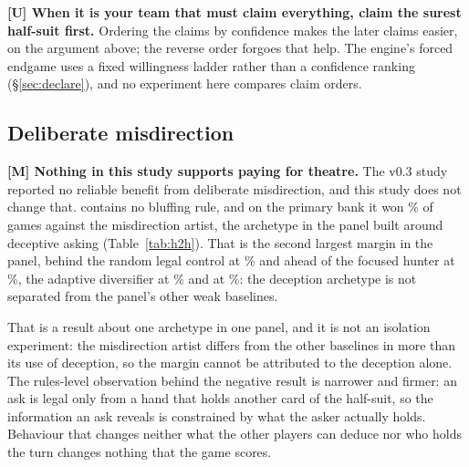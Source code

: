 \textbf{[U] When it is your team that must claim everything, claim the surest
half-suit first.} Ordering the claims by confidence makes the later claims
easier, on the argument above; the reverse order forgoes that help. The
engine's forced endgame uses a fixed willingness ladder rather than a confidence
ranking (\S\ref{sec:declare}), and no experiment here compares claim orders.

\subsection{Deliberate misdirection}
\label{app:human-bluff}

\textbf{[M] Nothing in this study supports paying for theatre.} The
v0.3 study reported no reliable benefit from deliberate misdirection, and this
study does not change that. \vfast{} contains no bluffing rule, and on the
primary bank it won \numVsBluffer\% of games against the misdirection artist,
the archetype in the panel built around deceptive asking
(Table~\ref{tab:h2h}). That is the second largest margin in the panel, behind
the random legal control at \numVsRandom\% and ahead of the focused hunter at
\numVsHunter\%, the adaptive diversifier at \numVsDiversifier\% and \vtwo{} at
\numVsVtwo\%: the deception archetype is not separated from the panel's other
weak baselines.

That is a result about one archetype in one panel, and it is not an isolation
experiment: the misdirection artist differs from the other baselines in more
than its use of deception, so the margin cannot be attributed to the deception
alone. The rules-level observation behind the negative result is narrower and
firmer: an ask is legal only from a hand that holds another card of the
half-suit, so the information an ask reveals is constrained by what the asker
actually holds. Behaviour that changes neither what the other players can deduce
nor who holds the turn changes nothing that the game scores.
